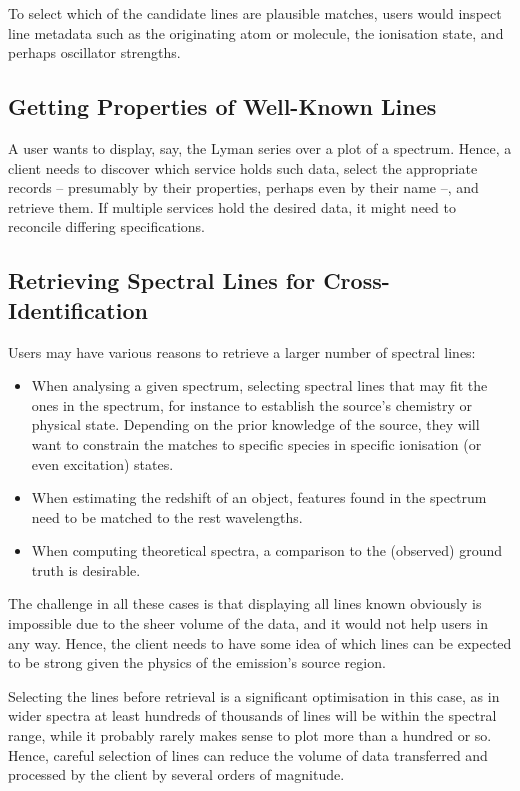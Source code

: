 \documentclass[11pt,a4paper]{ivoa}
\begin{document}
To select which of the candidate lines are plausible matches, users
would inspect line metadata such as the originating atom or molecule, the
ionisation state, and perhaps oscillator strengths.

\subsection{Getting Properties of Well-Known Lines}

A user wants to display, say, the Lyman series over a plot of a
spectrum.  Hence, a client needs to discover which service holds such
data, select the appropriate records -- presumably by their properties,
perhaps even by their name --, and retrieve them.  If multiple services
hold the desired data, it might need to reconcile differing
specifications.


\subsection{Retrieving Spectral Lines for Cross-Identification}

Users may have various reasons to retrieve a larger number of spectral
lines:

\begin{itemize}
\item When analysing a given spectrum, selecting spectral lines that may
fit the ones in the spectrum, for instance to establish the source's
chemistry or physical state.  Depending on the prior knowledge of the
source, they will want to constrain the matches to specific species in
specific ionisation (or even excitation) states.

\item When estimating the redshift of an object, features found in the
spectrum need to be matched to the rest wavelengths.

\item When computing theoretical spectra, a comparison to the (observed)
ground truth is desirable.
\end{itemize}

The challenge in all these cases is that displaying all lines
known obviously is impossible due to the sheer volume of the data,
and it would not help users in any way.
Hence, the client needs to have some idea of which lines can be expected
to be strong given the physics of the emission's source region.

Selecting the lines before retrieval is a significant optimisation in
this case, as in wider spectra at least hundreds of thousands of lines
will be within the spectral range, while it probably rarely makes sense
to plot more than a hundred or so.  Hence, careful selection of lines
can reduce the volume of data transferred and processed by the client by
several orders of magnitude.
\end{document}
